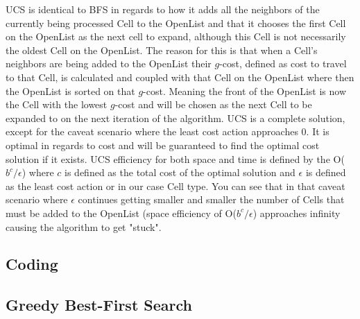 \documentclass[conference]{IEEEtran}
\begin{document}
UCS is identical to BFS in regards to how it adds all the neighbors of the currently being processed Cell to the OpenList and that it chooses the first Cell on the OpenList as the next cell to expand, although this Cell is not necessarily the oldest Cell on the OpenList. The reason for this is that when a Cell's neighbors are being added to the OpenList their $g$-cost, defined as cost to travel to that Cell, is calculated and coupled with that Cell on the OpenList where then the OpenList is sorted on that $g$-cost. Meaning the front of the OpenList is now the Cell with the lowest $g$-cost and will be chosen as the next Cell to be expanded to on the next iteration of the algorithm. UCS is a complete solution, except for the caveat scenario where the least cost action approaches 0. It is optimal in regards to cost and will be guaranteed to find the optimal cost solution if it exists. UCS efficiency for both space and time is defined by the O($b^c/\epsilon$) where $c$ is defined as the total cost of the optimal solution and $\epsilon$ is defined as the least cost action or in our case Cell type. You can see that in that caveat scenario where $\epsilon$ continues getting smaller and smaller the number of Cells that must be added to the OpenList (space efficiency of O($b^c/\epsilon$) approaches infinity causing the algorithm to get "stuck".

\subsection{Coding}
\subsection{Greedy Best-First Search}
\end{document}
